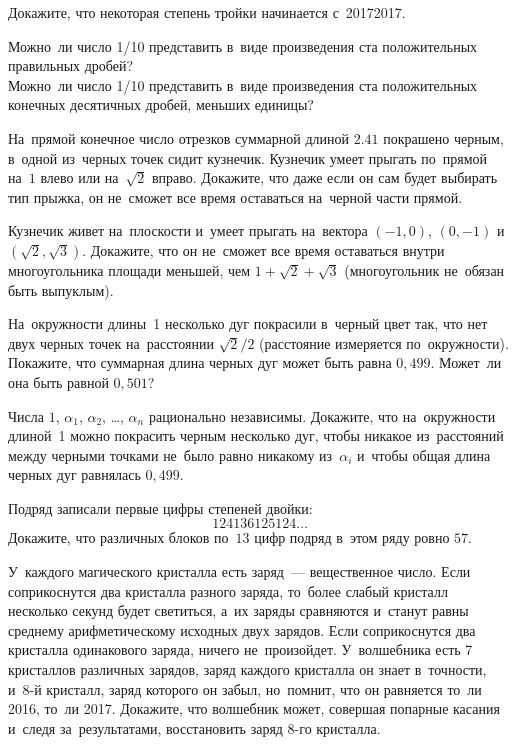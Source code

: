


\begin{problems}

\item
Докажите, что некоторая степень тройки начинается с~20172017.

\item
\subproblemx{*}
Можно~ли число 1/10 представить в~виде произведения ста положительных
правильных дробей?
\\
\subproblem
Можно~ли число 1/10 представить в~виде произведения ста положительных конечных
десятичных дробей, меньших единицы?

\item
На~прямой конечное число отрезков суммарной длиной $2.41$ покрашено черным,
в~одной из~черных точек сидит кузнечик.
Кузнечик умеет прыгать по~прямой на~$1$ влево или на~$\sqrt 2$ вправо.
Докажите, что даже если он сам будет выбирать тип прыжка, он не~сможет все
время оставаться на~черной части прямой.

\item
Кузнечик живет на~плоскости и~умеет прыгать на~вектора
$(-1, 0)$, $(0,-1)$ и~$(\sqrt{2}, \sqrt 3)$.
Докажите, что он не~сможет все время оставаться внутри многоугольника площади
меньшей, чем $1 + \sqrt 2 + \sqrt 3$ (многоугольник не~обязан быть выпуклым).

\item
На~окружности длины~1 несколько дуг покрасили в~черный цвет так, что нет двух
черных точек на~расстоянии $\sqrt{2}/2$ (расстояние измеряется по~окружности).
Покажите, что суммарная длина черных дуг может быть равна $0{,}499$.
Может~ли она быть равной $0{,}501$?

\item
Числа $1$, $\alpha_{1}$, $\alpha_2$, \ldots, $\alpha_{n}$ рационально
независимы.
Докажите, что на~окружности длиной~1 можно покрасить черным несколько дуг,
чтобы никакое из~расстояний между черными точками не~было равно никакому
из~$\alpha_{i}$ и~чтобы общая длина черных дуг равнялась $0{,}499$.

\item
Подряд записали первые цифры степеней двойки:
\[
    124136125124{\ldots}
\]
Докажите, что различных блоков по~$13$ цифр подряд в~этом ряду ровно $57$.

\item
У~каждого магического кристалла есть заряд~--- вещественное число.
Если соприкоснутся два кристалла разного заряда, то~более слабый кристалл
несколько секунд будет светиться, а~их заряды сравняются и~станут равны
среднему арифметическому исходных двух зарядов.
Если соприкоснутся два кристалла одинакового заряда, ничего не~произойдет.
У~волшебника есть 7 кристаллов различных зарядов, заряд каждого кристалла он
знает в~точности, и~8-й кристалл, заряд которого он забыл, но~помнит, что он
равняется то~ли 2016, то~ли 2017.
Докажите, что волшебник может, совершая попарные касания и~следя
за~результатами, восстановить заряд 8-го кристалла.

\end{problems}

